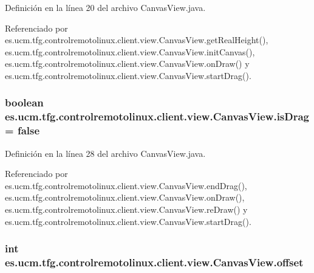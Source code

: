 Definición en la línea 20 del archivo Canvas\-View.\-java.



Referenciado por es.\-ucm.\-tfg.\-controlremotolinux.\-client.\-view.\-Canvas\-View.\-get\-Real\-Height(), es.\-ucm.\-tfg.\-controlremotolinux.\-client.\-view.\-Canvas\-View.\-init\-Canvas(), es.\-ucm.\-tfg.\-controlremotolinux.\-client.\-view.\-Canvas\-View.\-on\-Draw() y es.\-ucm.\-tfg.\-controlremotolinux.\-client.\-view.\-Canvas\-View.\-start\-Drag().

\hypertarget{classes_1_1ucm_1_1tfg_1_1controlremotolinux_1_1client_1_1view_1_1CanvasView_a488285310cfe212f86a95702de70f20b}{
\subsubsection[{is\-Drag}]{\setlength{\rightskip}{0pt plus 5cm}boolean es.\-ucm.\-tfg.\-controlremotolinux.\-client.\-view.\-Canvas\-View.\-is\-Drag = false\hspace{0.3cm}{\ttfamily [private]}}}\label{classes_1_1ucm_1_1tfg_1_1controlremotolinux_1_1client_1_1view_1_1CanvasView_a488285310cfe212f86a95702de70f20b}


Definición en la línea 28 del archivo Canvas\-View.\-java.



Referenciado por es.\-ucm.\-tfg.\-controlremotolinux.\-client.\-view.\-Canvas\-View.\-end\-Drag(), es.\-ucm.\-tfg.\-controlremotolinux.\-client.\-view.\-Canvas\-View.\-on\-Draw(), es.\-ucm.\-tfg.\-controlremotolinux.\-client.\-view.\-Canvas\-View.\-re\-Draw() y es.\-ucm.\-tfg.\-controlremotolinux.\-client.\-view.\-Canvas\-View.\-start\-Drag().

\hypertarget{classes_1_1ucm_1_1tfg_1_1controlremotolinux_1_1client_1_1view_1_1CanvasView_aaad40278d6a02c9ef89b426c0af45dc3}{
\subsubsection[{offset}]{\setlength{\rightskip}{0pt plus 5cm}int es.\-ucm.\-tfg.\-controlremotolinux.\-client.\-view.\-Canvas\-View.\-offset\hspace{0.3cm}{\ttfamily [private]}}}\label{classes_1_1ucm_1_1tfg_1_1controlremotolinux_1_1client_1_1view_1_1CanvasView_aaad40278d6a02c9ef89b426c0af45dc3}


